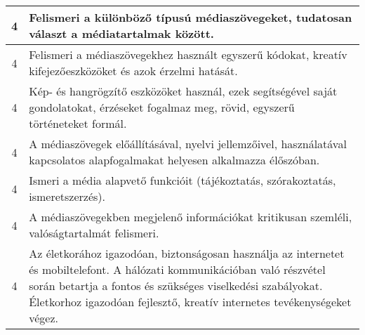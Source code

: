 \begin{longtable}{c | p{12cm} }
                                
                                          4 &  Felismeri a különböző típusú médiaszövegeket, tudatosan választ a médiatartalmak között. \\ \hline
                                          4 &  Felismeri a médiaszövegekhez használt egyszerű kódokat, kreatív kifejezőeszközöket és azok érzelmi hatását. \\ \hline
                                          4 &  Kép- és hangrögzítő eszközöket használ, ezek segítségével saját gondolatokat, érzéseket fogalmaz meg, rövid, egyszerű történeteket formál. \\ \hline
                                          4 &  A médiaszövegek előállításával, nyelvi jellemzőivel, használatával kapcsolatos alapfogalmakat  helyesen alkalmazza élőszóban. \\ \hline
                                          4 &  Ismeri a média alapvető funkcióit (tájékoztatás, szórakoztatás, ismeretszerzés). \\ \hline
                                          4 &  A médiaszövegekben megjelenő információkat kritikusan szemléli,  valóságtartalmát felismeri. \\ \hline
                                          4 &  Az életkorához igazodóan,  biztonságosan használja az internetet és mobiltelefont.  A hálózati kommunikációban való részvétel során betartja a fontos és szükséges viselkedési szabályokat. Életkorhoz igazodóan fejlesztő, kreatív internetes tevékenységeket végez. \\ \hline
                                      
                        \end{longtable}
            \clearpage

